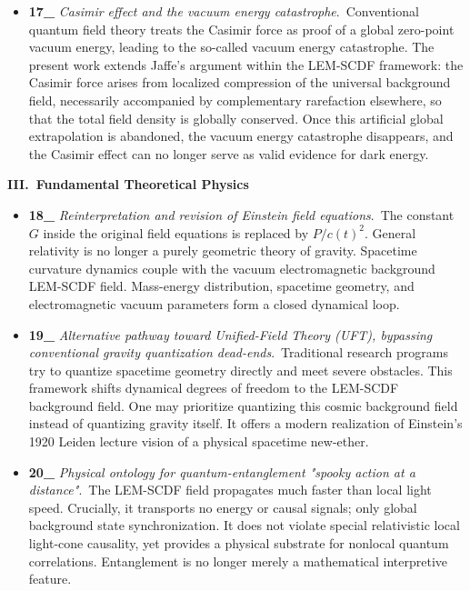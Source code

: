 \documentclass[12pt,leqno]{article}
\begin{document}
{\begin{itemize}
		\item \textbf{17\_} \textit{Casimir effect and the vacuum energy catastrophe}.\,\,\,Conventional quantum field theory treats the Casimir force as proof of a global zero-point vacuum energy, leading to the so-called vacuum energy catastrophe. The present work extends Jaffe's argument within the LEM-SCDF framework: the Casimir force arises from localized compression of the universal background field, necessarily accompanied by complementary rarefaction elsewhere, so that the total field density is globally conserved. Once this artificial global extrapolation is abandoned, the vacuum energy catastrophe disappears, and the Casimir effect can no longer serve as valid evidence for dark energy.
	\end{itemize}
	
		
	\medskip
	\bigskip
	\textbf{III.\ Fundamental Theoretical Physics}
	\begin{itemize}
		\item \textbf{18\_} \textit{Reinterpretation and revision of Einstein field equations}.\,\,\,The constant $G$ inside the original field equations is replaced by $P/c(t)^2$. General relativity is no longer a purely geometric theory of gravity. Spacetime curvature dynamics couple with the vacuum electromagnetic background LEM-SCDF field. Mass-energy distribution, spacetime geometry, and electromagnetic vacuum parameters form a closed dynamical loop.
		
		\item \textbf{19\_} \textit{Alternative pathway toward Unified-Field Theory (UFT), bypassing conventional gravity quantization dead-ends}.\,\,\,Traditional research programs try to quantize spacetime geometry directly and meet severe obstacles. This framework shifts dynamical degrees of freedom to the LEM-SCDF background field. One may prioritize quantizing this cosmic background field instead of quantizing gravity itself. It offers a modern realization of Einstein's 1920 Leiden lecture vision of a physical spacetime new-ether.
		
		\item \textbf{20\_} \textit{Physical ontology for quantum-entanglement "spooky action at a distance"}.\,\,\,The LEM-SCDF field propagates much faster than local light speed. Crucially, it transports no energy or causal signals; only global background state synchronization. It does not violate special relativistic local light-cone causality, yet provides a physical substrate for nonlocal quantum correlations. Entanglement is no longer merely a mathematical interpretive feature.
		

\end{itemize}}
\end{document}
